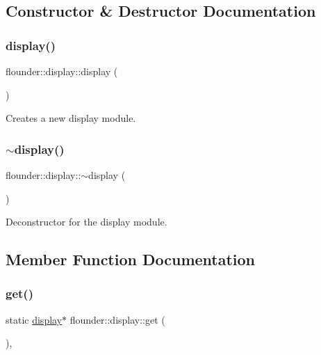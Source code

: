 \subsection{Constructor \& Destructor Documentation}
\mbox{\label{classflounder_1_1display_ac0a3910222a928f1fc60193cd65c0530}} 
\subsubsection{\texorpdfstring{display()}{display()}}
{\footnotesize\ttfamily flounder\+::display\+::display (\begin{DoxyParamCaption}{ }\end{DoxyParamCaption})}



Creates a new display module. 

\mbox{\label{classflounder_1_1display_a272f9080af9079cbb3890b18c3e4d394}} 
\subsubsection{\texorpdfstring{$\sim$display()}{~display()}}
{\footnotesize\ttfamily flounder\+::display\+::$\sim$display (\begin{DoxyParamCaption}{ }\end{DoxyParamCaption})}



Deconstructor for the display module. 



\subsection{Member Function Documentation}
\mbox{\label{classflounder_1_1display_a7c7015939f48bf4526bb0330ea4fcd2f}} 
\subsubsection{\texorpdfstring{get()}{get()}}
{\footnotesize\ttfamily static \hyperlink{classflounder_1_1display}{display}$\ast$ flounder\+::display\+::get (\begin{DoxyParamCaption}{ }\end{DoxyParamCaption})\hspace{0.3cm}{\ttfamily [inline]}, {\ttfamily [static]}}



